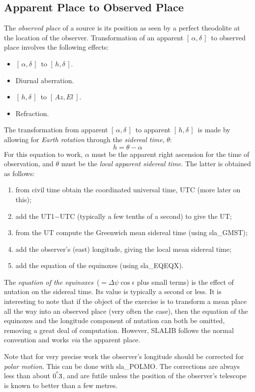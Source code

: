 \documentclass[11pt,twoside]{article}
\newcommand{\radec}     {$[\,\alpha,\delta\,]$}
\newcommand{\hadec}     {$[\,h,\delta\,]$}
\newcommand{\azel}      {$[\,Az,El~]$}
\newcommand{\arcsec}[2] {\arcseci{#1}$\hspace{-0.4em}.#2$}
\newcommand{\arcsec}[2] {
      {$#1\hspace{-0.05em}^{'\hspace{-0.1em}'}\hspace{-0.4em}.#2$}
   }
\newcommand{\arcseci}[1] {$#1\hspace{-0.05em}$\raisebox{-0.5ex}
                         {$^{'\hspace{-0.1em}'}$}}
\renewcommand{\arcseci}[1] {$#1\hspace{-0.05em}^{'\hspace{-0.1em}'}$}
\begin{document}
\subsection{Apparent Place to Observed Place}
The {\it observed place}\/ of a source is its position as
seen by a perfect theodolite at the location of the
observer.  Transformation of an apparent \radec\ to observed 
place involves the following effects:
\goodbreak
\begin{itemize}
   \item \radec\ to \hadec.
   \item Diurnal aberration.
   \item \hadec\ to \azel.
   \item Refraction.
\end{itemize}
The transformation from apparent \radec\ to
apparent \hadec\ is made by allowing for
{\it Earth rotation}\/ through the {\it sidereal time}, $\theta$:
\[ h = \theta - \alpha \]
For this equation to work, $\alpha$ must be the apparent right
ascension for the time of observation, and $\theta$ must be
the {\it local apparent sidereal time}.  The latter is obtained
as follows:
\begin{enumerate}
\item from civil time obtain the coordinated universal time, UTC
      (more later on this);
\item add the UT1$-$UTC (typically a few tenths of a second) to
      give the UT;
\item from the UT compute the Greenwich mean sidereal time (using
sla\_GMST);
\item add the observer's (east) longitude, giving the local mean
      sidereal time;
\item add the equation of the equinoxes (using
sla\_EQEQX).
\end{enumerate}
The {\it equation of the equinoxes}\/~($=\Delta\psi\cos\epsilon$ plus
small terms)
is the effect of nutation on the sidereal time.
Its value is typically a second or less.  It is
interesting to note that if the object of the exercise is to
transform a mean place all the way into an observed place (very
often the case),
then the equation of the
equinoxes and the longitude component of nutation can both be
omitted, removing a great deal of computation.  However, SLALIB
follows the normal convention and  works {\it via}\/ the apparent place.

Note that for very precise work the observer's longitude should
be corrected for {\it polar motion}.  This can be done with
sla\_POLMO.
The corrections are always less than about \arcsec{0}{3}, and
are futile unless the position of the observer's telescope is known
to better than a few metres.
\end{document}
